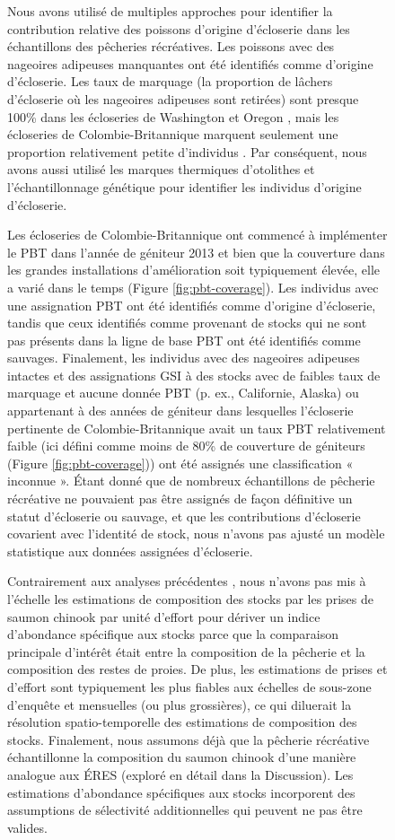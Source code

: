 \begin{figure}[H]
Nous avons utilisé de multiples approches pour identifier la contribution relative des poissons d'origine d'écloserie dans les échantillons des pêcheries récréatives. Les poissons avec des nageoires adipeuses manquantes ont été identifiés comme d'origine d'écloserie. Les taux de marquage (la proportion de lâchers d'écloserie où les nageoires adipeuses sont retirées) sont presque 100\% dans les écloseries de Washington et Oregon \citep{andersonReviewHatcheryReform2020, wdfwAnadromousSalmonSteelhead2021, odfwFishPropagationAnnual2022}, mais les écloseries de Colombie-Britannique marquent seulement une proportion relativement petite d'individus \citep{pscLessonsLearnedReport2016}. Par conséquent, nous avons aussi utilisé les marques thermiques d'otolithes et l'échantillonnage génétique pour identifier les individus d'origine d'écloserie.

Les écloseries de Colombie-Britannique ont commencé à implémenter le PBT dans l'année de géniteur 2013 et bien que la couverture dans les grandes installations d'amélioration soit typiquement élevée, elle a varié dans le temps (Figure \ref{fig:pbt-coverage}). Les individus avec une assignation PBT ont été identifiés comme d'origine d'écloserie, tandis que ceux identifiés comme provenant de stocks qui ne sont pas présents dans la ligne de base PBT ont été identifiés comme sauvages. Finalement, les individus avec des nageoires adipeuses intactes et des assignations GSI à des stocks avec de faibles taux de marquage et aucune donnée PBT (p. ex., Californie, Alaska) ou appartenant à des années de géniteur dans lesquelles l'écloserie pertinente de Colombie-Britannique avait un taux PBT relativement faible (ici défini comme moins de 80\% de couverture de géniteurs (Figure \ref{fig:pbt-coverage})) ont été assignés une classification « inconnue ». Étant donné que de nombreux échantillons de pêcherie récréative ne pouvaient pas être assignés de façon définitive un statut d'écloserie ou sauvage, et que les contributions d'écloserie covarient avec l'identité de stock, nous n'avons pas ajusté un modèle statistique aux données assignées d'écloserie.

Contrairement aux analyses précédentes \cite[p. ex.,][]{freshwaterIntegratedModelSeasonal2021}, nous n'avons pas mis à l'échelle les estimations de composition des stocks par les prises de saumon chinook par unité d'effort pour dériver un indice d'abondance spécifique aux stocks parce que la comparaison principale d'intérêt était entre la composition de la pêcherie et la composition des restes de proies. De plus, les estimations de prises et d'effort sont typiquement les plus fiables aux échelles de sous-zone d'enquête et mensuelles (ou plus grossières), ce qui diluerait la résolution spatio-temporelle des estimations de composition des stocks. Finalement, nous assumons déjà que la pêcherie récréative échantillonne la composition du saumon chinook d'une manière analogue aux ÉRES (exploré en détail dans la Discussion). Les estimations d'abondance spécifiques aux stocks incorporent des assumptions de sélectivité additionnelles qui peuvent ne pas être valides.


\end{figure}
